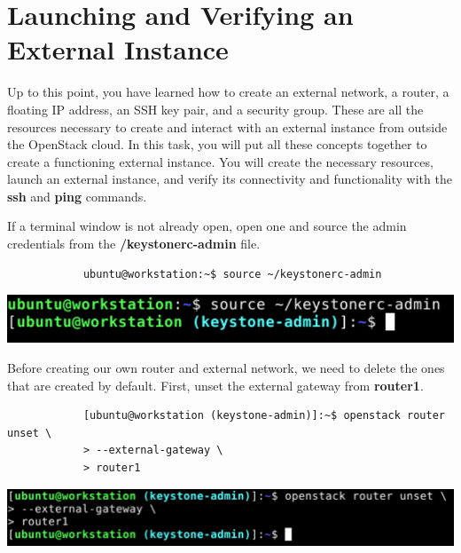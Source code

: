 \documentclass[letterpaper, 12pt]{article}
\begin{document}
\section{Launching and Verifying an External Instance}\label{sec:launching-an-external-instance}
Up to this point, you have learned how to create an external network, a router, a floating IP address, an SSH key pair, and a security group.
These are all the resources necessary to create and interact with an external instance from outside the OpenStack cloud.
In this task, you will put all these concepts together to create a functioning external instance.
You will create the necessary resources, launch an external instance, and verify its connectivity and functionality with the \textbf{ssh} and \textbf{ping} commands.

\begin{enumerate}
    \begin{labstep}
        If a terminal window is not already open, open one and source the admin credentials from the \textbf{\texttildemid/keystonerc-admin} file.
        \begin{lstlisting}
            ubuntu@workstation:~$ source ~/keystonerc-admin
        \end{lstlisting}

        \begin{center}
            \includegraphics[width=\linewidth]{images/part5/step1.png}
        \end{center}
    \end{labstep}

    \begin{labstep}
        Before creating our own router and external network, we need to delete the ones that are created by default.
        First, unset the external gateway from \textbf{router1}.
        \begin{lstlisting}
            [ubuntu@workstation (keystone-admin)]:~$ openstack router unset \
            > --external-gateway \
            > router1
        \end{lstlisting}

        \begin{center}
            \includegraphics[width=\linewidth]{images/part5/step2.png}
        \end{center}
    \end{labstep}


\end{enumerate}
\end{document}
